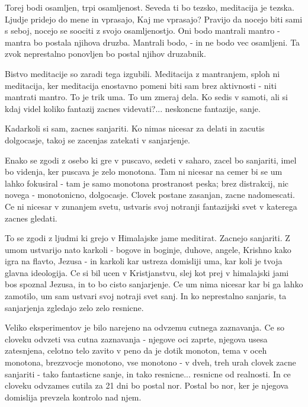 Torej bodi osamljen, trpi osamljenost. Seveda ti bo tezsko, meditacija je tezska. Ljudje pridejo do mene in vprasajo,  Kaj me vprasajo? Pravijo da nocejo biti sami s seboj, nocejo se soociti z svojo osamljenostjo. Oni bodo mantrali mantro - mantra bo postala njihova druzba. Mantrali bodo,  - in ne bodo vec osamljeni. Ta zvok  neprestalno ponovljen bo postal njihov druzabnik. 

Bistvo meditacije so zaradi tega izgubili. Meditacija z mantranjem, sploh ni meditacija, ker meditacija enostavno pomeni biti sam brez aktivnosti - niti mantrati mantro. To je trik uma. To um zmeraj dela. Ko sedis v samoti, ali si kdaj videl koliko fantazij zacnes videvati?... neskoncne fantazije, sanje. 

Kadarkoli si sam, zacnes sanjariti. Ko nimas nicesar za delati in zacutis dolgocasje, takoj se zacenjas zatekati v sanjarjenje. 

Enako se zgodi z osebo ki gre v puscavo, sedeti v saharo, zacel bo sanjariti, imel bo videnja, ker puscava je zelo monotona. Tam ni nicesar na cemer bi se um lahko fokusiral - tam je samo monotona prostranost peska; brez distrakcij, nic novega - monotonicno, dolgocasje. Clovek postane zasanjan, zacne nadomescati. Ce ni nicesar v zunanjem svetu, ustvaris svoj notranji fantazijski svet v katerega zacnes gledati. 

To se zgodi z ljudmi ki grejo v Himalajske jame meditirat. Zacnejo sanjariti. Z umom ustvarijo nato karkoli - bogove in boginje, duhove, angele, Krishno kako igra na flavto, Jezusa - in karkoli kar ustreza domisliji uma, kar koli je tvoja glavna ideologija. Ce si bil ucen v Kristjanstvu, slej kot prej v himalajski jami bos spoznal Jezusa, in to bo cisto sanjarjenje. Ce um nima nicesar kar bi ga lahko zamotilo, um sam ustvari svoj notraji svet sanj. In ko neprestalno sanjaris, ta sanjarjenja zgledajo zelo zelo resnicne. 

Veliko eksperimentov je bilo narejeno na odvzemu cutnega zaznavanja. Ce so cloveku odvzeti vsa cutna zaznavanja - njegove oci zaprte, njegova usesa zatesnjena, celotno telo zavito v peno da je dotik monoton, tema v oceh monotona, brezzvocje monotono, vse monotono - v dveh, treh urah clovek zacne sanjariti - tako fantasticne sanje, in tako resnicne... resnicne od realnosti. In ce cloveku odvzames cutila za 21 dni bo postal nor. Postal bo nor, ker je njegova domislija prevzela kontrolo nad njem. 


